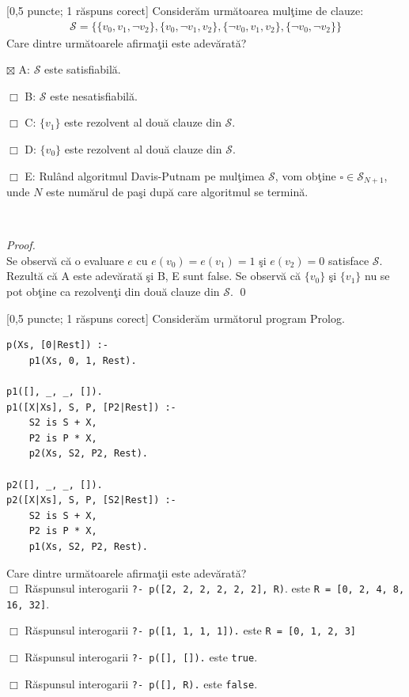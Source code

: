 \documentclass[12pt]{article}
\newcommand{\probex}{\stepcounter{uebno}{\vspace{0.3cm}\noindent \bf (P\arabic{uebno}) }}
\newcommand{\solutiong}[1]{$\,$ \\ \begin{proof}\mbox{}\\#1 \qed \end{proof}}
\begin{document}
\probex [0,5 puncte; 1 r\u{a}spuns corect] Consider\u{a}m urm\u atoarea mul\c time de clauze:
\begin{align*}
    \mathcal{S} = \{ \{v_0, v_1, \neg v_2\}, \{v_0, \neg v_1, v_2\}, \{\neg v_0, v_1, v_2\}, \{\neg v_0, \neg v_2\} \}
\end{align*}
Care dintre urm\u{a}toarele afirma\c{t}ii este adev\u{a}rat\u{a}?

$\boxtimes$ A: $\mathcal{S}$ este satisfiabil\u{a}. 

$\Box$ B: $\mathcal{S}$ este nesatisfiabil\u{a}. 

$\Box$ C: $\{v_1\}$ este rezolvent al dou\u{a} clauze din $\mathcal{S}$. 

$\Box$ D: $\{v_0\}$ este rezolvent al dou\u{a} clauze din $\mathcal{S}$. 


$\Box$ E: Rul\^{a}nd algoritmul Davis-Putnam pe mul\c{t}imea $\mathcal{S}$,
vom ob\c{t}ine $\square \in \mathcal{S}_{N + 1}$,
unde $N$ este num\u{a}rul de pa\c{s}i dup\u{a} care algoritmul se termin\u{a}. 


\solutiong{
    Se observ\u{a} c\u{a} o evaluare $e$ cu 
    $e(v_0) = e(v_1) = 1$ \c{s}i $e(v_2) = 0$ satisface $\mathcal{S}$. 
    Rezult\u{a} c\u{a} A este adev\u{a}rat\u{a} \c{s}i B, E sunt false.
    Se observ\u{a} c\u{a} $\{v_0\}$ \c{s}i $\{v_1\}$ nu se pot ob\c{t}ine ca rezolven\c{t}i din dou\u{a} clauze din $\mathcal{S}$.
}


\probex [0,5 puncte; 1 r\u{a}spuns corect]
Consider\u{a}m urm\u{a}torul program Prolog.
\begin{verbatim}
p(Xs, [0|Rest]) :-
    p1(Xs, 0, 1, Rest).

p1([], _, _, []).
p1([X|Xs], S, P, [P2|Rest]) :-
    S2 is S + X,
    P2 is P * X,
    p2(Xs, S2, P2, Rest). 

p2([], _, _, []).
p2([X|Xs], S, P, [S2|Rest]) :-
    S2 is S + X,
    P2 is P * X,
    p1(Xs, S2, P2, Rest). 
\end{verbatim}
Care dintre urm\u{a}toarele afirma\c{t}ii este adev\u{a}rat\u{a}? \\ 
$\Box$ R\u{a}spunsul interogarii \texttt{?- p([2, 2, 2, 2, 2, 2], R)}. este \texttt{R = [0, 2, 4, 8, 16, 32]}.

$\Box$ R\u{a}spunsul interogarii \texttt{?- p([1, 1, 1, 1]).} este \texttt{R = [0, 1, 2, 3]}

$\Box$ R\u{a}spunsul interogarii \texttt{?- p([], []).} este \texttt{true}.

$\Box$ R\u{a}spunsul interogarii \texttt{?- p([], R).} este \texttt{false}. 
\end{document}
